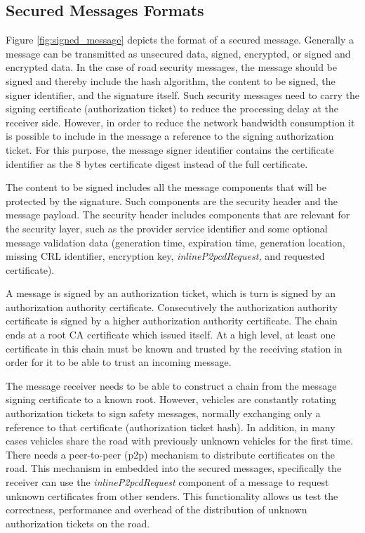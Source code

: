 \subsection{Secured Messages Formats}
Figure \ref{fig:signed_message} depicts the format of a secured message. Generally a message can be transmitted as unsecured data, signed, encrypted, or signed and encrypted data. In the case of road security messages, the message should be signed and thereby include the hash algorithm, the content to be signed, the signer identifier, and the signature itself. Such security messages need to carry the signing certificate (authorization ticket) to reduce the processing delay at the receiver side. However, in order to reduce the network bandwidth consumption it is possible to include in the message a reference to the signing authorization ticket. For this purpose, the message signer identifier contains the certificate identifier as the 8 bytes certificate digest instead of the full certificate. 

The content to be signed includes all the message components that will be protected by the signature. Such components are the security header and the message payload. The security header includes components that are relevant for the security layer, such as the provider service identifier and some optional message validation data (generation time, expiration time, generation location, missing CRL identifier, encryption key, \textit{inlineP2pcdRequest,} and requested certificate).



A message is signed by an authorization ticket, which is turn is signed by an authorization authority certificate. Consecutively the authorization authority certificate is signed by a higher authorization authority certificate. The chain ends at a root CA certificate which issued itself. At a high level, at least one certificate in this chain must be known and trusted by the receiving station in order for it to be able to trust an incoming message.

The message receiver needs to be able to construct a chain from the message signing certificate to a known root. However, vehicles are constantly rotating authorization tickets to sign safety messages, normally exchanging only a reference to that certificate (authorization ticket hash). In addition, in many cases vehicles share the road with previously unknown vehicles for the first time. There needs a peer-to-peer (p2p) mechanism to distribute certificates on the road. This mechanism in embedded into the secured messages, specifically the receiver can use the \textit{inlineP2pcdRequest} component of a message to request unknown certificates from other senders. This functionality allows us test the correctness, performance and overhead of the distribution of unknown authorization tickets on the road.

